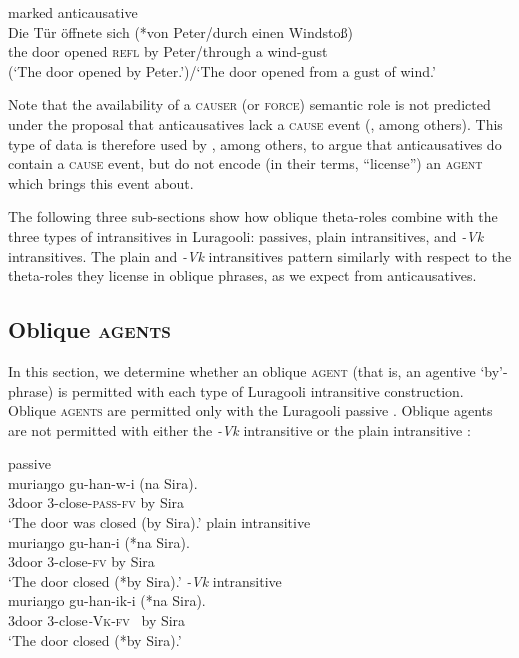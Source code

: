\documentclass[output=paper]{langsci/lanmgscibook}
\begin{document}
\ex\label{ex:gluckman:6c}
{{marked anticausative}}\\
\gll   Die Tür   öffnete sich (*von Peter/durch einen Windstoß)\\
       the door opened \textsc{refl}  by   Peter/through a wind-gust\\
\glt (‘The door opened by Peter.’)/‘The door opened from a gust of wind.’
\z
\z

Note that the availability of a \textsc{causer} (or \textsc{force}) semantic role is not predicted under the proposal that anticausatives lack a\textsc{ cause} event (\citealt{Haspelmath1993}, among others). This type of data is therefore used by \citet{Schäfer2008}, among others, to argue that anticausatives do contain a \textsc{cause} event, but do not encode (in their terms, “license”) an \textsc{agent} which brings this event about. 

The following three sub-sections show how oblique theta-roles combine with the three types of intransitives in Luragooli: passives, plain intransitives, and \textit{-Vk} intransitives. The plain and \textit{-Vk} intransitives pattern similarly with respect to the theta-roles they license in oblique phrases, as we expect from anticausatives.

\subsection{Oblique \textsc{agents}} 

In this section, we determine whether an oblique \textsc{agent} (that is, an agentive ‘by’-phrase) is permitted with each type of Luragooli intransitive construction. Oblique \textsc{agents} are permitted only with the Luragooli passive . Oblique agents are not permitted with either the \textit{-Vk} intransitive  or the plain intransitive :

\ea\label{ex:gluckman:7} 
  \ea\label{ex:gluckman:7a} 
  {{passive}}\\
  \gll muriaŋgo gu-han-w-i            (na Sira).\\
      3door       3-close-\textsc{pass}-\textsc{fv}    by  Sira\\
  \glt ‘The door was closed (by Sira).’
  \ex\label{ex:gluckman:7b} 
  {{ plain intransitive}}\\
  \gll muriaŋgo gu-han-i   (*na Sira).\\
      3door      3-close-\textsc{fv}   by   Sira\\
  \glt ‘The door closed (*by Sira).’
  \ex\label{ex:gluckman:7c} 
  {{\textit{-Vk}}{ intransitive}}\\
  \gll muriaŋgo gu-han-ik-i     (*na Sira).\\
      3door       3-close\textit{-}\textsc{Vk}-\textsc{fv}~ by  Sira\\
  \glt     ‘The door closed (*by Sira).’\\
  \z
\z
     
\end{document}
